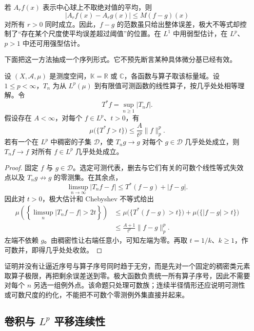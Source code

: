 若 \(A_rf(x)\) 表示中心球上不取绝对值的平均，则
\[
 |A_rf(x)-A_rg(x)|\leq M(f-g)(x)
\]
对所有 \(r>0\) 同时成立。因此，\(f-g\) 的范数虽只给出整体误差，极大不等式却控制了“存在某个尺度使平均误差超过阈值”的位置。在 \(L^1\) 中用弱型估计，在 \(L^p\)、\(p>1\) 中还可用强型估计。

\ProseParagraphBreak

下面把这一方法抽成一个序列形式。它不预先断言某种具体微分基已经有效。

\begin{proposition}[极大估计下的收敛延拓]\label{b1:prop:maximal-convergence-principle}
设 \((X,\mathcal A,\mu)\) 是测度空间，\(\mathbb K=\mathbb R\) 或 \(\mathbb C\)，各函数与算子取该标量域。设 \(1\leq p<\infty\)，\(T_n\) 为从 \(L^p(\mu)\) 到有限值可测函数的线性算子，按几乎处处相等理解。令
\[
 T^*f=\sup_{n\geq1}|T_nf|.
\]
假设存在 \(A<\infty\)，对每个 \(f\in L^p\)、\(t>0\)，有
\[
 \mu\bigl(\{T^*f>t\}\bigr)\leq\frac A{t^p}\|f\|_p^p.
\]
若有一个在 \(L^p\) 中稠密的子集 \(\mathcal D\)，使 \(T_ng\to g\) 对每个 \(g\in\mathcal D\) 几乎处处成立，则 \(T_nf\to f\) 对所有 \(f\in L^p\) 几乎处处成立。
\end{proposition}
\begin{proof}
固定 \(f\) 与 \(g\in\mathcal D\)。选定可测代表，删去与它们有关的可数个线性等式失效点以及 \(T_ng\not\to g\) 的零测集。在其余点，
\[
 \limsup_{n\to\infty}|T_nf-f|
 \leq T^*(f-g)+|f-g|.
\]
因此对 \(t>0\)，极大估计和 Chebyshev 不等式给出
\[
 \begin{aligned}
 \mu\left(\left\{\limsup_n|T_nf-f|>2t\right\}\right)
 &\leq\mu\bigl(\{T^*(f-g)>t\}\bigr)
       +\mu\bigl(\{|f-g|>t\}\bigr)\\
 &\leq\frac{A+1}{t^p}\|f-g\|_p^p.
 \end{aligned}
\]
左端不依赖 \(g\)。由稠密性让右端任意小，可知左端为零。再取 \(t=1/k\)、\(k\geq1\)，作可数并，即得几乎处处收敛。
\end{proof}

证明并没有让逼近序号与算子序号同时趋于无穷，而是先对一个固定的稠密类元素取算子极限，再把剩余误差送到零。极大函数负责统一所有算子序号，因此不需要对每个 \(n\) 另选一组例外点。该命题只处理可数族；连续半径情形还应说明可测性或可数尺度的约化，不能把不可数个零测例外集直接并起来。

\subsection{卷积与 \texorpdfstring{\(L^p\)}{Lp} 平移连续性}
\label{b1:subsec:1304-convolution-translation}

